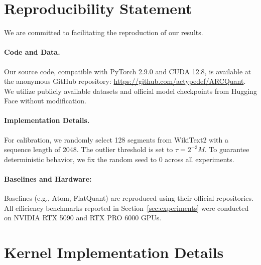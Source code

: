 \documentclass[11pt]{article}
\begin{document}
\section{Reproducibility Statement}
\label{appendix:reproducibility}

We are committed to facilitating the reproduction of our results. 

\paragraph{Code and Data.}
Our source code, compatible with PyTorch 2.9.0 and CUDA 12.8, is available at the anonymous GitHub repository: \url{https://github.com/actypedef/ARCQuant}. 
We utilize publicly available datasets and official model checkpoints from Hugging Face without modification.
\paragraph{Implementation Details.}
For calibration, we randomly select 128 segments from WikiText2 with a sequence length of 2048. The outlier threshold is set to $\tau = 2^{-3}M$. To guarantee deterministic behavior, we fix the random seed to 0 across all experiments. 
\paragraph{Baselines and Hardware:}
Baselines (e.g., Atom, FlatQuant) are reproduced using their official repositories. All efficiency benchmarks reported in Section~\ref{sec:experiments} were conducted on NVIDIA RTX 5090 and RTX PRO 6000 GPUs.

\section{Kernel Implementation Details}
\label{appendix:kernel_design}
\end{document}
